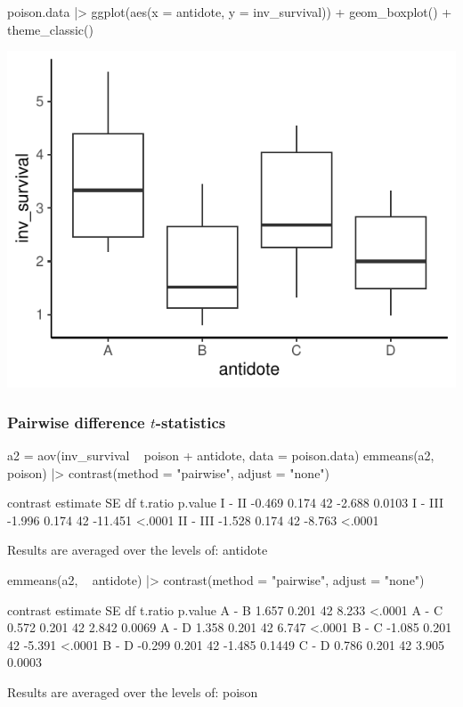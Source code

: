 \documentclass[a4paper]{article}
\begin{document}
\begin{minipage}[t]{0.49\textwidth}
\begin{Schunk}
\begin{Sinput}
poison.data |> 
  ggplot(aes(x = antidote, y = inv_survival)) +
  geom_boxplot() +
  theme_classic()
\end{Sinput}


{\centering \includegraphics[width=\maxwidth]{figure/listings-unnamed-chunk-327-1} 

}

\end{Schunk}
\end{minipage}
\subsubsection{Pairwise difference \( t \)-statistics}
\begin{Schunk}
\begin{Sinput}
a2 = aov(inv_survival ~ poison + antidote, data = poison.data)
emmeans(a2, ~ poison) |> contrast(method = "pairwise", adjust = "none")
\end{Sinput}
\begin{Soutput}
 contrast estimate    SE df t.ratio p.value
 I - II     -0.469 0.174 42  -2.688  0.0103
 I - III    -1.996 0.174 42 -11.451  <.0001
 II - III   -1.528 0.174 42  -8.763  <.0001

Results are averaged over the levels of: antidote 
\end{Soutput}
\begin{Sinput}
emmeans(a2, ~ antidote) |> contrast(method = "pairwise", adjust = "none")
\end{Sinput}
\begin{Soutput}
 contrast estimate    SE df t.ratio p.value
 A - B       1.657 0.201 42   8.233  <.0001
 A - C       0.572 0.201 42   2.842  0.0069
 A - D       1.358 0.201 42   6.747  <.0001
 B - C      -1.085 0.201 42  -5.391  <.0001
 B - D      -0.299 0.201 42  -1.485  0.1449
 C - D       0.786 0.201 42   3.905  0.0003

Results are averaged over the levels of: poison 
\end{Soutput}
\end{Schunk}
\end{document}
